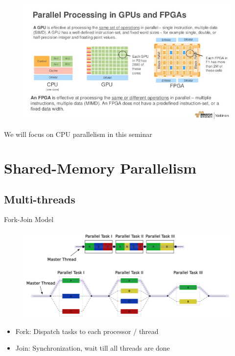 \documentclass{../TexTemplate/myslide}
\begin{document}
\begin{frame}
\begin{figure}
\centering
\includegraphics[width=\linewidth]{fig/gpu-fpga.jpg}
\end{figure}
\pause
We will focus on CPU parallelism in this seminar
\end{frame}

\section{Shared-Memory Parallelism}
\begin{frame}
\sectionpage
\end{frame}

\subsection{Multi-threads}
\begin{frame}
\subsectionpage
\end{frame}

\begin{frame}{Fork-Join Model}
\begin{figure}
\centering
\includegraphics[width=\linewidth]{fig/fork-join.png}
\end{figure}
\begin{itemize}
	\item Fork: Dispatch tasks to each processor / thread
	\item Join: Synchronization, wait till all threads are done
\end{itemize}
\end{frame}
\end{document}
